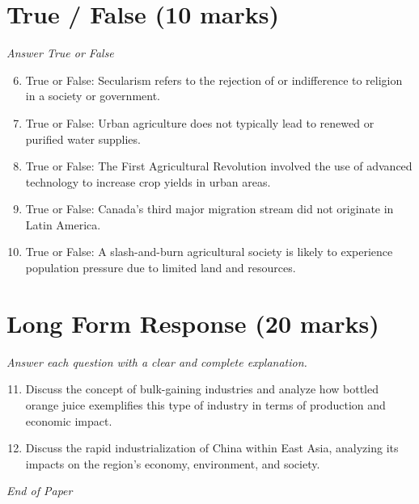 \documentclass[12pt]{article}
\begin{document}
\section*{True / False (10 marks)}
\textit{Answer True or False}
\begin{enumerate}[label=\arabic*.]
\setcounter{enumi}{5}
\item True or False: Secularism refers to the rejection of or indifference to religion in a society or government.
\item True or False: Urban agriculture does not typically lead to renewed or purified water supplies.
\item True or False: The First Agricultural Revolution involved the use of advanced technology to increase crop yields in urban areas.
\item True or False: Canada's third major migration stream did not originate in Latin America.
\item True or False: A slash-and-burn agricultural society is likely to experience population pressure due to limited land and resources.
\end{enumerate}

\section*{Long Form Response (20 marks)}
\textit{Answer each question with a clear and complete explanation.}
\begin{enumerate}[label=\arabic*.]
\setcounter{enumi}{10}
\item Discuss the concept of bulk-gaining industries and analyze how bottled orange juice exemplifies this type of industry in terms of production and economic impact.
\item Discuss the rapid industrialization of China within East Asia, analyzing its impacts on the region's economy, environment, and society.
\end{enumerate}

\vfill
\noindent\textit{End of Paper}
\end{document}
